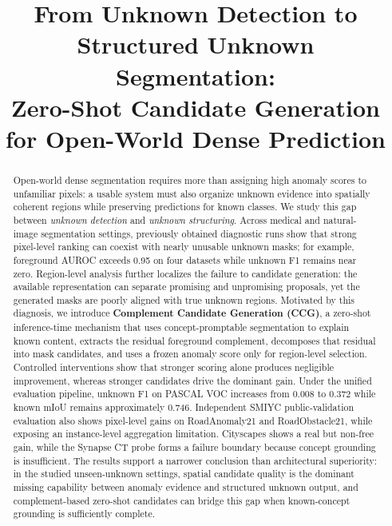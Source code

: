 \documentclass[journal]{IEEEtai}
\newcommand{\CCG}{\textsc{CCG}\xspace}
\begin{document}
\title{From Unknown Detection to Structured Unknown Segmentation:\\Zero-Shot Candidate Generation for Open-World Dense Prediction}

\author{}


\maketitle

\begin{abstract}
Open-world dense segmentation requires more than assigning high anomaly scores to unfamiliar pixels: a usable system must also organize unknown evidence into spatially coherent regions while preserving predictions for known classes. We study this gap between \emph{unknown detection} and \emph{unknown structuring}. Across medical and natural-image segmentation settings, previously obtained diagnostic runs show that strong pixel-level ranking can coexist with nearly unusable unknown masks; for example, foreground AUROC exceeds 0.95 on four datasets while unknown F1 remains near zero. Region-level analysis further localizes the failure to candidate generation: the available representation can separate promising and unpromising proposals, yet the generated masks are poorly aligned with true unknown regions. Motivated by this diagnosis, we introduce \textbf{Complement Candidate Generation (\CCG)}, a zero-shot inference-time mechanism that uses concept-promptable segmentation to explain known content, extracts the residual foreground complement, decomposes that residual into mask candidates, and uses a frozen anomaly score only for region-level selection. Controlled interventions show that stronger scoring alone produces negligible improvement, whereas stronger candidates drive the dominant gain. Under the unified evaluation pipeline, unknown F1 on PASCAL VOC increases from 0.008 to 0.372 while known mIoU remains approximately 0.746. Independent SMIYC public-validation evaluation also shows pixel-level gains on RoadAnomaly21 and RoadObstacle21, while exposing an instance-level aggregation limitation. Cityscapes shows a real but non-free gain, while the Synapse CT probe forms a failure boundary because concept grounding is insufficient. The results support a narrower conclusion than architectural superiority: in the studied unseen-unknown settings, spatial candidate quality is the dominant missing capability between anomaly evidence and structured unknown output, and complement-based zero-shot candidates can bridge this gap when known-concept grounding is sufficiently complete.
\end{abstract}
\end{document}

